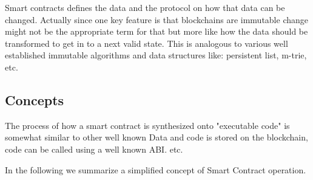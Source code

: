 \documentclass[a4paper]{article}
\begin{document}
Smart contracts defines the data and the protocol on how that data can be changed. Actually since one key feature is that blockchains are immutable change might not be the appropriate term for that but more like how the data should be transformed to get in to a next valid state. This is analogous to various well established immutable algorithms and data structures like: persistent list, m-trie, etc. \cite{persistent_data_structures} 

\subsection{Concepts}\label{sec:EthSmartContracConcepts}

The process of how a smart contract is synthesized onto "executable code" is somewhat similar to other well known 
Data and code is stored on the blockchain, code can be called using a well known ABI. etc.



In the following we summarize a simplified concept of Smart Contract operation.
\end{document}
